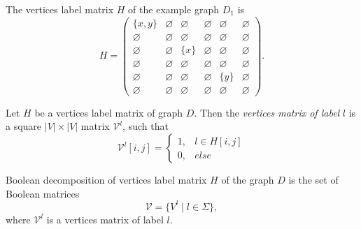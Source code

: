The vertices label matrix $H$ of the example graph $D_1$ is
{
    \renewcommand{\arraystretch}{0.7}
    \setlength\arraycolsep{2pt}
$$
    H =
    \begin{pmatrix}
    \{x, y\}        & \varnothing     &   \varnothing      &   \varnothing   &   \varnothing   &    \varnothing  \\
    \varnothing     &   \varnothing   & \varnothing        &   \varnothing   & \varnothing     & \varnothing     \\
    \varnothing     &   \varnothing   &   \{x\}            &   \varnothing   & \varnothing     &   \varnothing   \\
    \varnothing     &   \varnothing   & \varnothing        &   \varnothing   &   \varnothing   &   \varnothing   \\
    \varnothing     &   \varnothing   &   \varnothing      &    \varnothing  &   \{y\}         & \varnothing     \\
    \varnothing     & \varnothing     &   \varnothing      &   \varnothing   & \varnothing     &   \varnothing
    \end{pmatrix}.
$$
}

\begin{definition}
Let $H$ be a vertices label matrix of graph $D$. Then the \emph{vertices matrix of label} $l$ is a square $|V|\times|V|$ matrix $\mathcal{V}^l$, such that
\begin{equation*}
\mathcal{V}^l[i,j] = 
  \begin{cases}
    1,  & l \in H[i, j] \\
    0,  & else
  \end{cases}
\end{equation*}
\end{definition}

\begin{definition}
Boolean decomposition of vertices label matrix $H$ of the graph $D$ is the set of Boolean matrices
$$\mathcal{V} = \{V^l \mid l \in \Sigma\},$$
where $\mathcal{V}^l$ is a vertices matrix of label $l$.
\end{definition}

